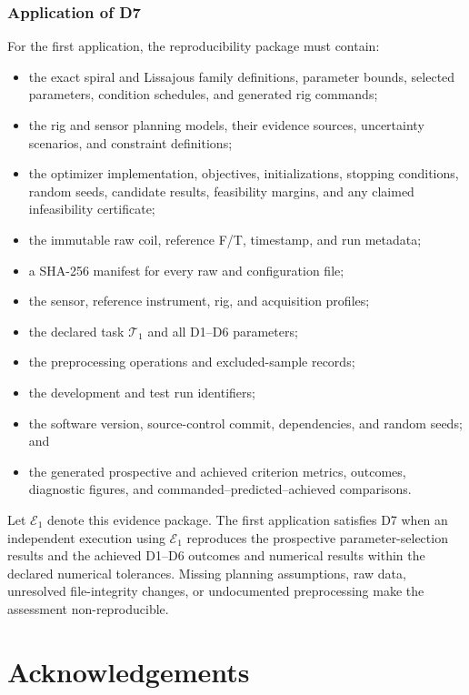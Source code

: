 \documentclass[11pt,a4paper]{article}
\begin{document}
\subsubsection{Application of D7}

For the first application, the reproducibility package must contain:
\begin{itemize}
    \item the exact spiral and Lissajous family definitions, parameter bounds,
        selected parameters, condition schedules, and generated rig commands;
    \item the rig and sensor planning models, their evidence sources,
        uncertainty scenarios, and constraint definitions;
    \item the optimizer implementation, objectives, initializations, stopping
        conditions, random seeds, candidate results, feasibility margins, and
        any claimed infeasibility certificate;
    \item the immutable raw coil, reference F/T, timestamp, and run metadata;
    \item a SHA-256 manifest for every raw and configuration file;
    \item the sensor, reference instrument, rig, and acquisition profiles;
    \item the declared task $\mathcal{T}_1$ and all D1--D6 parameters;
    \item the preprocessing operations and excluded-sample records;
    \item the development and test run identifiers;
    \item the software version, source-control commit, dependencies, and random
        seeds; and
    \item the generated prospective and achieved criterion metrics, outcomes,
        diagnostic figures, and commanded--predicted--achieved comparisons.
\end{itemize}

Let $\mathcal{E}_1$ denote this evidence package. The first application
satisfies D7 when an independent execution using $\mathcal{E}_1$ reproduces
the prospective parameter-selection results and the achieved D1--D6 outcomes
and numerical results within the declared numerical tolerances. Missing
planning assumptions, raw data, unresolved file-integrity changes, or
undocumented preprocessing make the assessment non-reproducible.

\section*{Acknowledgements}
\end{document}
